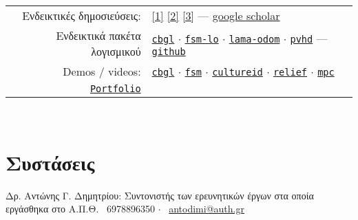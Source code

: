 \documentclass[a4paper,10pt,twoside]{article}
\begin{document}
\begin{tabular}{rp{12cm}}
  Ενδεικτικές δημοσιεύσεις: &
\href{https://ieeexplore.ieee.org/abstract/document/9981228}{[1]}
\href{https://www.sciencedirect.com/science/article/abs/pii/S0921889021002323}{[2]}
\href{https://www.tandfonline.com/doi/full/10.1080/00207179.2018.1514129}{[3]} --- \href{https://scholar.google.com/citations?view\_op=list\_works\&hl=en\&user=9\_hI4hMAAAAJ}{google scholar}\\

  Ενδεικτικά πακέτα λογισμικού&
\href{https://github.com/li9i/cbgl}{\texttt{cbgl}} $\cdot$
\href{https://github.com/li9i/fsm-lo}{\texttt{fsm-lo}} $\cdot$
\href{https://github.com/li9i/lama-odom}{\texttt{lama-odom}} $\cdot$
\href{https://github.com/li9i/pandora\_vision\_2014/tree/hydro-devel/pandora\_vision\_hole\_detector}{\texttt{pvhd}} --- \href{https://github.com/li9i}{\texttt{github}}\\

  Demos / videos: & \href{https://www.youtube.com/watch?v=xaDKjI0WkDc}{\texttt{cbgl}} $\cdot$ \href{https://www.youtube.com/watch?v=hB4qsHCEXGI}{\texttt{fsm}} $\cdot$ \href{https://cultureid.web.auth.gr/?page\_id=200&lang=en}{\texttt{cultureid}} $\cdot$ \href{https://relief.web.auth.gr/}{\texttt{relief}} $\cdot$ \href{https://www.youtube.com/watch?v=937OZez1iN8}{\texttt{mpc}}\\

  \href{https://raw.githubusercontent.com/li9i/portfolio/master/portfolio.pdf}{\texttt{Portfolio}} &
\end{tabular}
\\

\section{Συστάσεις}
\noindent Δρ. Αντώνης Γ. Δημητρίου: Συντονιστής των ερευνητικών έργων στα οποία εργάσθηκα στο Α.Π.Θ. \hspace{1cm}
\faPhone \ 6978896350 $\cdot$ \faEnvelopeO \ \href{mailto:antodimi@auth.gr}{antodimi@auth.gr} \\




\end{document}
